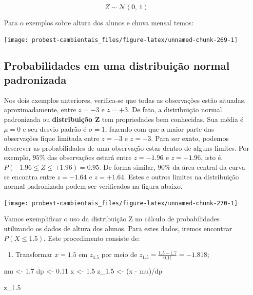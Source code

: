 \documentclass[
]{book}
\newenvironment{Shaded}{\begin{snugshade}}{\end{snugshade}}
\newcommand{\FloatTok}[1]{\textcolor[rgb]{0.00,0.00,0.81}{#1}}
\newcommand{\NormalTok}[1]{#1}
\newcommand{\OtherTok}[1]{\textcolor[rgb]{0.56,0.35,0.01}{#1}}
\newcommand{\SpecialCharTok}[1]{\textcolor[rgb]{0.00,0.00,0.00}{#1}}
\providecommand{\tightlist}{%
  \setlength{\itemsep}{0pt}\setlength{\parskip}{0pt}}
\begin{document}
\[Z \sim \mathcal{N}(0,\,1)\]

Para o exemplos sobre altura dos alunos e chuva mensal temos:

\begin{center}\texttt{[image: probest-cambientais\_files/figure-latex/unnamed-chunk-269-1]} \end{center}

\hypertarget{probabilidades-em-uma-distribuiuxe7uxe3o-normal-padronizada}{%
\subsection{Probabilidades em uma distribuição normal padronizada}\label{probabilidades-em-uma-distribuiuxe7uxe3o-normal-padronizada}}

Nos dois exemplos anteriores, verifica-se que todas as observações estão situadas, aproximadamente, entre \(z = -3\) e \(z = +3\). De fato, a distribuição normal padronizada ou \textbf{distribuição Z} tem propriedades bem conhecidas. Sua média é \(\mu = 0\) e seu desvio padrão é \(\sigma = 1\), fazendo com que a maior parte das observações fique limitada entre \(z = -3\) e \(z = +3\). Para ser exato, podemos descrever as probabilidades de uma observação estar dentro de alguns limites. Por exemplo, \(95\%\) das observações estará entre \(z = -1.96\) e \(z = +1.96\), isto é, \(P(-1.96 \le Z \le +1.96) = 0.95\). De forma similar, \(90\%\) da área central da curva se encontra entre \(z = -1.64\) e \(z = +1.64\). Estes e outros limites na distribuição normal padronizada podem ser verificados na figura abaixo.

\begin{center}\texttt{[image: probest-cambientais\_files/figure-latex/unnamed-chunk-270-1]} \end{center}

Vamos exemplificar o uso da distribuição Z no cálculo de probabilidades utilizando os dados de altura dos alunos. Para estes dados, iremos encontrar \(P(X \le 1.5)\). Este procedimento consiste de:

\begin{enumerate}
\def\labelenumi{\arabic{enumi}.}
\tightlist
\item
  Transformar \(x = 1.5\) em \(z_{1.5}\) por meio de \(z_{1.5} = \frac{1.5 - 1.7}{0.11} = -1.818\);
\end{enumerate}

\begin{Shaded}
\begin{Highlighting}[]
\NormalTok{mu }\OtherTok{\textless{}{-}} \FloatTok{1.7}
\NormalTok{dp }\OtherTok{\textless{}{-}} \FloatTok{0.11}
\NormalTok{x }\OtherTok{\textless{}{-}} \FloatTok{1.5}
\NormalTok{z\_1}\FloatTok{.5} \OtherTok{\textless{}{-}}\NormalTok{ (x }\SpecialCharTok{{-}}\NormalTok{ mu)}\SpecialCharTok{/}\NormalTok{dp}

\NormalTok{z\_1}\FloatTok{.5}
\end{Highlighting}
\end{Shaded}
\end{document}
